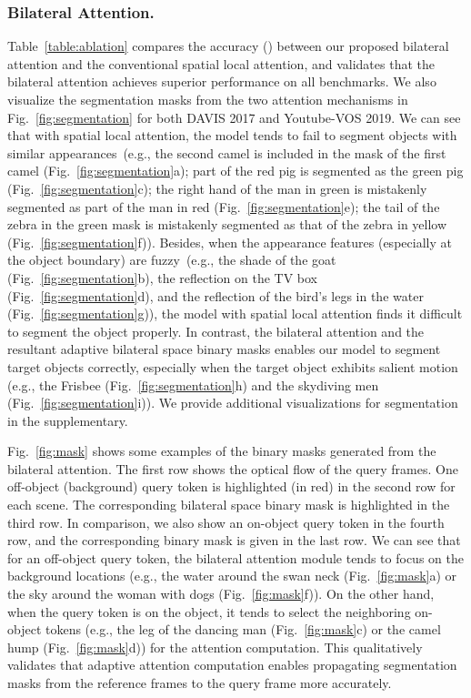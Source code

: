 \documentclass[runningheads]{llncs}
\begin{document}
\subsubsection{Bilateral Attention.} 
Table~\ref{table:ablation} compares the accuracy () between our proposed bilateral attention and the conventional spatial local attention, and validates that the bilateral attention achieves superior performance on all benchmarks. We also visualize the segmentation masks from the two attention mechanisms in Fig.~\ref{fig:segmentation} for both DAVIS 2017 and Youtube-VOS 2019. We can see that with spatial local attention, the model tends to fail to segment objects with similar appearances~(e.g., the second camel is included in the mask of the first camel (Fig.~\ref{fig:segmentation}a); part of the red pig is segmented as the green pig (Fig.~\ref{fig:segmentation}c); the right hand of the man in green is mistakenly segmented as part of the man in red (Fig.~\ref{fig:segmentation}e); the tail of the zebra in the green mask is mistakenly segmented as that of the zebra in yellow (Fig.~\ref{fig:segmentation}f)). Besides, when the appearance features (especially at the object boundary) are fuzzy~(e.g., the shade of the goat (Fig.~\ref{fig:segmentation}b), the reflection on the TV box (Fig.~\ref{fig:segmentation}d), and the reflection of the bird's legs in the water (Fig.~\ref{fig:segmentation}g)), the model with spatial local attention finds it difficult to segment the object properly. 
In contrast, the bilateral attention and the resultant adaptive bilateral space binary masks enables our model to segment target objects correctly, especially when the target object exhibits salient motion (e.g., the Frisbee (Fig.~\ref{fig:segmentation}h) and the skydiving men (Fig.~\ref{fig:segmentation}i)). We provide additional visualizations for segmentation in the supplementary.




Fig.~\ref{fig:mask} shows some examples of the binary masks generated from the bilateral attention. The first row shows the optical flow of the query frames. One off-object (background) query token is highlighted (in red) in the second row for each scene. The corresponding bilateral space binary mask is highlighted in the third row. In comparison, we also show an on-object query token in the fourth row, and the corresponding binary mask is given in the last row. We can see that for an off-object query token, the bilateral attention module tends to focus on the background locations (e.g., the water around the swan neck (Fig.~\ref{fig:mask}a) or the sky around the woman with dogs (Fig.~\ref{fig:mask}f)). On the other hand, when the query token is on the object, it tends to select the neighboring on-object tokens (e.g., the leg of the dancing man (Fig.~\ref{fig:mask}c) or the camel hump (Fig.~\ref{fig:mask}d)) for the attention computation. This qualitatively validates that adaptive attention computation enables propagating segmentation masks from the reference frames to the query frame more accurately.
\end{document}
